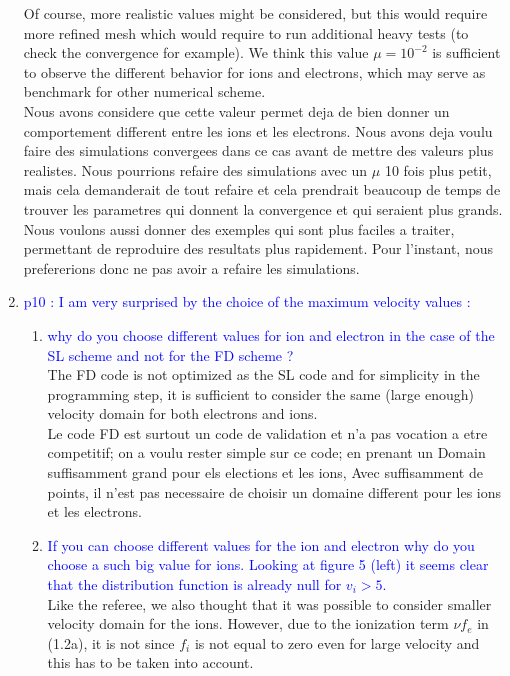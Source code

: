 \documentclass{article}
\begin{document}
\begin{enumerate}
    Of course, more realistic values might be considered, but this would require more refined mesh which would require 
    to run additional heavy tests (to check the convergence for example). We think this value $\mu=10^{-2}$ is sufficient 
    to observe the different behavior for ions and electrons, which may serve as benchmark for other numerical scheme. \\
    {\small Nous avons considere que cette valeur permet deja de bien donner un comportement different entre les ions et les electrons. Nous avons deja voulu faire des simulations convergees dans ce cas
avant de mettre des valeurs plus realistes. Nous pourrions refaire des simulations avec un $\mu$ 10 fois plus petit, mais cela demanderait de tout refaire et cela prendrait beaucoup de temps
de trouver les parametres qui donnent la convergence et qui seraient plus grands. Nous voulons aussi donner des exemples qui sont plus faciles a traiter, permettant de reproduire des resultats plus rapidement. 
Pour l'instant, nous prefererions donc ne pas avoir a refaire les simulations.}
    \item \textcolor{blue}{p10 : I am very surprised by the choice of the maximum velocity values :}
    \begin{enumerate}
\item \textcolor{blue}{ why do you choose different values for ion and electron in the case of the SL scheme
and not for the FD scheme ?} \\
The FD code is not optimized as the SL code and for simplicity in the programming step, 
it is sufficient to consider the same (large enough) velocity domain for both electrons and ions. \\
{\small Le code FD est surtout un code de validation et n'a pas vocation a etre competitif; on a voulu rester simple sur ce code; en prenant un Domain suffisamment grand pour els elections et les ions,
Avec suffisamment de points, il n'est pas necessaire de choisir un domaine different pour les ions et les electrons.}
\item \textcolor{blue}{If you can choose different values for the ion and electron why do you choose a such big value for ions. Looking at figure 5 (left) it seems clear that the distribution function is already null for $v_i > 5$.}\\
Like the referee, we also thought that it was possible to consider smaller velocity domain for the ions. However, due to the 
ionization term $\nu f_e$ in (1.2a), it is not since $f_i$ is not equal to zero even for large velocity and this has to be taken into account. 

\end{enumerate}
\end{enumerate}
\end{document}
